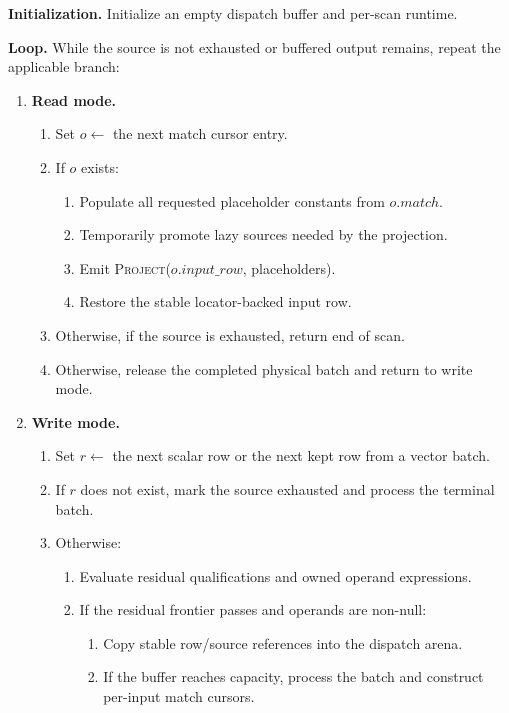\begin{algorithm}[htbp]
\caption{Conceptual execution of a scan-owned \texttt{mmsearch}}
\label{alg:customscan-write-read}
\small
\textbf{Initialization.} Initialize an empty dispatch buffer and per-scan
runtime.

\textbf{Loop.} While the source is not exhausted or buffered output remains,
repeat the applicable branch:
\begin{enumerate}
  \item \textbf{Read mode.}
    \begin{enumerate}
      \item Set \(o \gets\) the next match cursor entry.
      \item If \(o\) exists:
        \begin{enumerate}
          \item Populate all requested placeholder constants from \(o.match\).
          \item Temporarily promote lazy sources needed by the projection.
          \item Emit \textsc{Project}(\(o.input\_row\), placeholders).
          \item Restore the stable locator-backed input row.
        \end{enumerate}
      \item Otherwise, if the source is exhausted, return end of scan.
      \item Otherwise, release the completed physical batch and return to
            write mode.
    \end{enumerate}
  \item \textbf{Write mode.}
    \begin{enumerate}
      \item Set \(r \gets\) the next scalar row or the next kept row from a
            vector batch.
      \item If \(r\) does not exist, mark the source exhausted and process the
            terminal batch.
      \item Otherwise:
        \begin{enumerate}
          \item Evaluate residual qualifications and owned operand
                expressions.
          \item If the residual frontier passes and operands are non-null:
            \begin{enumerate}
              \item Copy stable row/source references into the dispatch arena.
              \item If the buffer reaches capacity, process the batch and
                    construct per-input match cursors.
            \end{enumerate}
        \end{enumerate}
    \end{enumerate}
\end{enumerate}
\end{algorithm}

